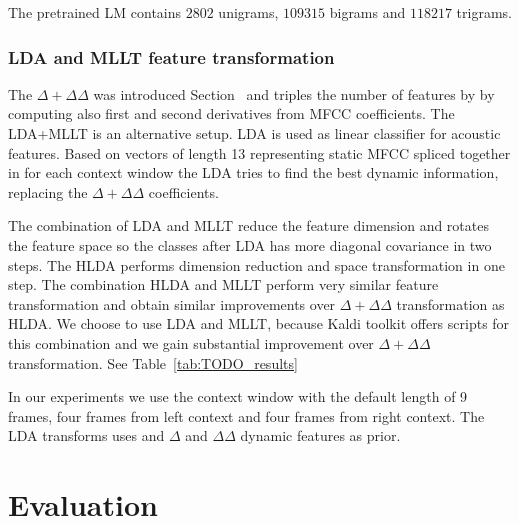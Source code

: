 The pretrained \ac{LM} contains $2802$ unigrams, $109315$ bigrams and
$118217$ trigrams. 

\subsubsection*{\acl{LDA} and \ac{MLLT} feature transformation}
The $\Delta + \Delta\Delta$ was introduced Section~\label{sub:param} and triples the number of features by by computing also first and second derivatives from \ac{MFCC} coefficients.
The \ac{LDA}+\ac{MLLT} is an alternative setup.
\ac{LDA} is used as linear classifier for acoustic features.
Based on vectors of length 13 representing static \ac{MFCC} 
spliced together in for each context window the \ac{LDA} tries to 
find the best dynamic information, replacing the $\Delta+\Delta\Delta$ coefficients.

The combination of \ac{LDA} and \ac{MLLT} reduce the feature dimension and
rotates the feature space so the classes after \ac{LDA} has more diagonal covariance in two steps.\cite{gopinath1998maximum}
The \ac{HLDA} performs dimension reduction and space transformation in one step.\cite{gales1999semi}
The combination \ac{HLDA} and \ac{MLLT} perform very similar feature transformation
and obtain similar improvements over $\Delta+\Delta\Delta$ transformation 
as \ac{HLDA}\cite{gales1999semi}\cite{gopinath1998maximum}.
We choose to use \ac{LDA} and \ac{MLLT}, because Kaldi toolkit offers scripts 
for this combination and we gain substantial improvement over $\Delta+\Delta\Delta$ transformation.
See Table~\ref{tab:TODO_results}

In our experiments we use the context window with the default length of 9 frames, 
four frames from left context and four frames from right context.
The \ac{LDA} transforms uses and $\Delta$ and $\Delta\Delta$ dynamic features as prior.



\section{Evaluation}
\label{sec:am_eval}


